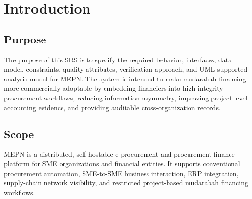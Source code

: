 \documentclass[11pt,a4paper]{article}
\newcommand{\systemshort}{MEPN}
\begin{document}
\section{Introduction}

\subsection{Purpose}
The purpose of this SRS is to specify the required behavior, interfaces, data model, constraints, quality attributes, verification approach, and UML-supported analysis model for \systemshort{}. The system is intended to make mudarabah financing more commercially adoptable by embedding financiers into high-integrity procurement workflows, reducing information asymmetry, improving project-level accounting evidence, and providing auditable cross-organization records.

\subsection{Scope}
\systemshort{} is a distributed, self-hostable e-procurement and procurement-finance platform for SME organizations and financial entities. It supports conventional procurement automation, SME-to-SME business interaction, ERP integration, supply-chain network visibility, and restricted project-based mudarabah financing workflows.
\end{document}
